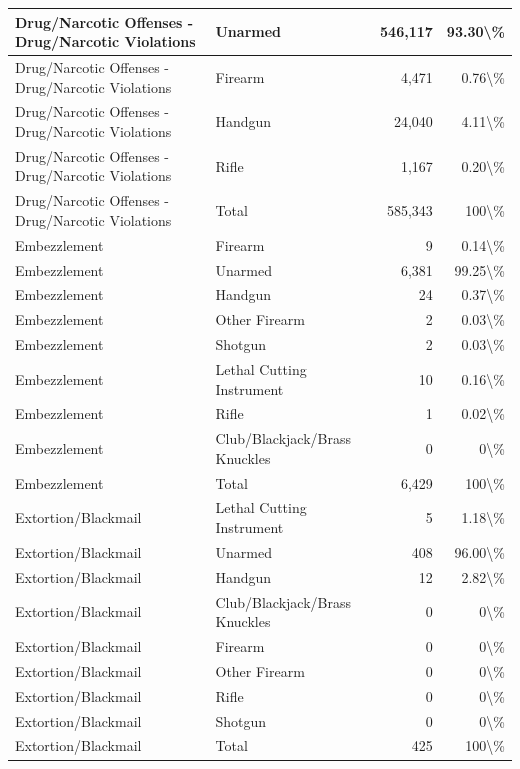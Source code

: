 \documentclass[
]{krantz}
\begin{document}
\begin{longtable}[t]{l|l|r|r}
\hline
Drug/Narcotic Offenses - Drug/Narcotic Violations & Unarmed & 546,117 & 93.30\textbackslash{}\%\\
\hline
Drug/Narcotic Offenses - Drug/Narcotic Violations & Firearm & 4,471 & 0.76\textbackslash{}\%\\
\hline
Drug/Narcotic Offenses - Drug/Narcotic Violations & Handgun & 24,040 & 4.11\textbackslash{}\%\\
\hline
Drug/Narcotic Offenses - Drug/Narcotic Violations & Rifle & 1,167 & 0.20\textbackslash{}\%\\
\hline
Drug/Narcotic Offenses - Drug/Narcotic Violations & Total & 585,343 & 100\textbackslash{}\%\\
\hline
Embezzlement & Firearm & 9 & 0.14\textbackslash{}\%\\
\hline
Embezzlement & Unarmed & 6,381 & 99.25\textbackslash{}\%\\
\hline
Embezzlement & Handgun & 24 & 0.37\textbackslash{}\%\\
\hline
Embezzlement & Other Firearm & 2 & 0.03\textbackslash{}\%\\
\hline
Embezzlement & Shotgun & 2 & 0.03\textbackslash{}\%\\
\hline
Embezzlement & Lethal Cutting Instrument & 10 & 0.16\textbackslash{}\%\\
\hline
Embezzlement & Rifle & 1 & 0.02\textbackslash{}\%\\
\hline
Embezzlement & Club/Blackjack/Brass Knuckles & 0 & 0\textbackslash{}\%\\
\hline
Embezzlement & Total & 6,429 & 100\textbackslash{}\%\\
\hline
Extortion/Blackmail & Lethal Cutting Instrument & 5 & 1.18\textbackslash{}\%\\
\hline
Extortion/Blackmail & Unarmed & 408 & 96.00\textbackslash{}\%\\
\hline
Extortion/Blackmail & Handgun & 12 & 2.82\textbackslash{}\%\\
\hline
Extortion/Blackmail & Club/Blackjack/Brass Knuckles & 0 & 0\textbackslash{}\%\\
\hline
Extortion/Blackmail & Firearm & 0 & 0\textbackslash{}\%\\
\hline
Extortion/Blackmail & Other Firearm & 0 & 0\textbackslash{}\%\\
\hline
Extortion/Blackmail & Rifle & 0 & 0\textbackslash{}\%\\
\hline
Extortion/Blackmail & Shotgun & 0 & 0\textbackslash{}\%\\
\hline
Extortion/Blackmail & Total & 425 & 100\textbackslash{}\%\\

\end{longtable}
\end{document}
